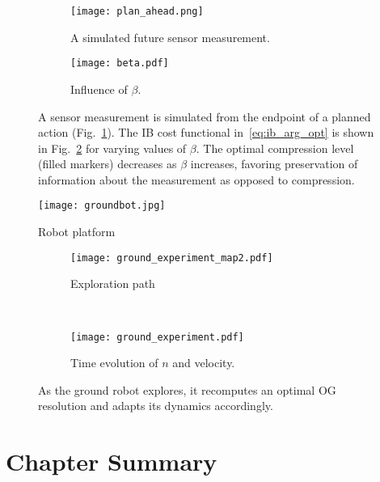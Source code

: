 \begin{figure}
    \centering
    \begin{subfigure}[t]{0.5\textwidth}
        \centering
        \texttt{[image: plan\_ahead.png]}
        \caption{A simulated future sensor measurement.\label{fig:loss_compression1}}
    \end{subfigure}
    \hfill
    \begin{subfigure}[t]{0.44\textwidth}
        \centering
        \texttt{[image: beta.pdf]}
        \caption{Influence of $\beta$.\label{fig:loss_compression2}}
    \end{subfigure}
    \caption[Information Bottleneck optimization for varying values of $\beta$]{
      A sensor measurement is simulated from the endpoint of a planned action
      (Fig.~\ref{fig:loss_compression1}). The IB cost functional
      in~\eqref{eq:ib_arg_opt} is shown in Fig.~\ref{fig:loss_compression2} for
      varying values of $\beta$. The optimal compression level (filled markers)
     decreases as $\beta$ increases, favoring preservation of information about the
   measurement as opposed to compression. \label{fig:loss_compression}}
\end{figure}
%
\begin{figure}
  \centering
  \texttt{[image: groundbot.jpg]}
  \caption[Experimental robot platform.]{Robot platform\label{fig:robot_platform}}
\end{figure}

\begin{figure}
  \centering
  \begin{subfigure}[t]{0.64\textwidth}
    \centering
    \texttt{[image: ground\_experiment\_map2.pdf]}
    \caption{Exploration path \label{fig:ib_exploration_path}}
  \end{subfigure}
  \\
  \begin{subfigure}[t]{0.8\textwidth}
    \centering
    \texttt{[image: ground\_experiment.pdf]}
    \caption{Time evolution of $n$ and velocity.\label{fig:ib_exploration_plots}}
  \end{subfigure}
  \caption{As the ground robot explores, it recomputes an optimal OG resolution and
  adapts its dynamics accordingly.\label{fig:ground_experiment}}
\end{figure}

\section{Chapter Summary}



